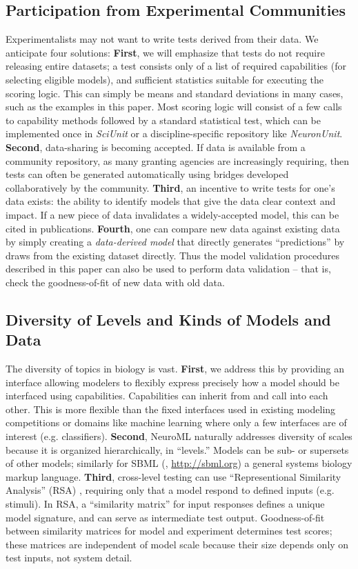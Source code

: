 \documentclass{frontiersSCNS}
\begin{document}
\subsection{Participation from Experimental Communities}
Experimentalists may not want to write tests derived from their data.  
We anticipate four solutions: 
\textbf{First}, we will emphasize that tests do not require releasing entire datasets; a test consists only of a list of required  capabilities (for selecting eligible models), and sufficient statistics suitable for executing the scoring logic. This can simply be means and standard deviations in many cases, such as the examples in this paper. Most scoring logic will consist of a few calls to capability methods followed by a standard statistical test, which can be implemented once in \textit{SciUnit} or a discipline-specific repository like \textit{NeuronUnit}.
\textbf{Second}, data-sharing is becoming accepted. If data is available from a community repository, as many granting agencies are increasingly requiring, then tests can often be generated automatically using bridges developed collaboratively by the community. 
\textbf{Third}, an incentive to write tests for one's data exists: the ability to identify models that give the data clear context and impact. If a new piece of data invalidates a widely-accepted model, this can be cited in publications.  
\textbf{Fourth}, one can compare new data against existing data by simply creating a \emph{data-derived model} that directly generates ``predictions'' by draws from the existing dataset directly. Thus the model validation procedures described in this paper can also be used to perform data validation -- that is, check the goodness-of-fit of new data with old data.

\subsection{Diversity of Levels and Kinds of Models and Data}
The diversity of topics in biology is vast. 
\textbf{First}, we address this by providing an interface allowing modelers to flexibly express precisely how a model should be interfaced using capabilities. 
Capabilities can inherit from and call into each other. 
This is more flexible than the fixed interfaces used in existing modeling competitions or domains like machine learning where only a few interfaces are of interest (e.g. classifiers). 
\textbf{Second}, NeuroML naturally addresses diversity of scales because it is organized hierarchically, in ``levels.''  
Models can be sub- or supersets of other models; similarly for SBML (\cite{hucka_systems_2003}, \url{http://sbml.org}) a general systems biology markup language. 
\textbf{Third}, cross-level testing can use ``Representional Similarity Analysis'' (RSA) \citep{kriegeskorte_representational_2008}, requiring only that a model respond to defined inputs (e.g. stimuli). 
In RSA, a ``similarity matrix'' for input responses defines a unique model signature, and can serve as intermediate test output. 
Goodness-of-fit between similarity matrices for model and experiment determines test scores; 
these matrices are independent of model scale because their size depends only on test inputs, not system detail.  
\end{document}

